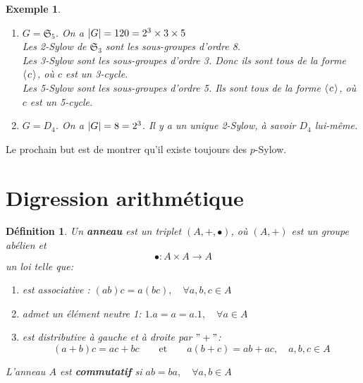 \documentclass[a4paper, oneside]{report}
\theoremstyle{break}
\newtheorem{definition}[thm]{Définition}
\newtheorem{exemple}[thm]{Exemple}
\newcommand{\sg}{sous-groupe }
\newcommand{\x}{\times}
\renewcommand{\S}{\mathfrak{S}}
\DeclarePairedDelimiter\abs{\lvert}{\rvert}%
\newcommand{\pro}[1]{\langle\hspace{0.1em}#1\hspace{0.1em}\rangle}
\newcommand{\slign}{\textbf}
\begin{document}
\begin{exemple}
\begin{enumerate}
\begin{itemize}
\item les deux 4-cycles : $\sigma$ et 
\begin{align*}
\sigma^{-1} &= (a \; b \; c \; d)
\\
&= (a \; c) \sigma (a \; c)^{-1}
\\
&= (b \; d) \sigma (b \; d)^{-1}
\end{align*}
\end{itemize}
Notons que $P$ n'est pas distingué dans $\S_4$.\\
Les 3-Sylow de $\mathfrak{S}_4$ sont les sous-groupes d'ordre 3.\\
Ils sont tous de la forme $\pro{c}$, où $c$ est un 3-cycle (exercice : compter le nombre de 3-cycles et le nombre de \sg d'ordre 3). Ils sont tous conjugués.\\

\item $G = \mathfrak{S}_5$. On a $\abs{G} = 120 = 2^3 \x 3 \x 5$\\
Les 2-Sylow de $\mathfrak{S}_3$ sont les sous-groupes d'ordre 8.\\
Les 3-Sylow sont les sous-groupes d'ordre 3. Donc ils sont tous de la forme $\pro{c}$, où $c$ est un 3-cycle.\\
Les 5-Sylow sont les sous-groupes d'ordre 5. Ils sont tous de la forme $\pro{c}$, où $c$ est un 5-cycle.\\
\item $G = D_4$. On a $\abs{G} = 8 = 2^3$. Il y a un unique 2-Sylow, à savoir $D_4$ lui-même.
\end{enumerate}
\end{exemple}
Le prochain but est de montrer qu'il existe toujours des $p$-Sylow.

\section{Digression arithmétique}

\begin{definition}
Un \slign{anneau} est un triplet $(A, +, \bullet)$, où $(A, +)$ est un groupe abélien et
\[
\bullet : A \times A \longrightarrow A
\]
un loi telle que:
\begin{enumerate}
\item est associative :	\quad	$(ab)c = a(bc),	\quad	\forall a, b, c \in A$
\item admet un élément neutre 1:	\quad	$1.a = a = a.1,	\quad	\forall a \in A$
\item est distributive à gauche et à droite par $"+"$:
\[
(a + b) c = ac + bc		\qquad	\text{et}	\qquad	a(b + c) = ab + ac, \quad	a, b, c \in A
\]
\end{enumerate}
L'anneau $A$ est \slign{commutatif} si $ab = ba,	\quad	\forall a, b \in A$
\end{definition}
\end{document}

